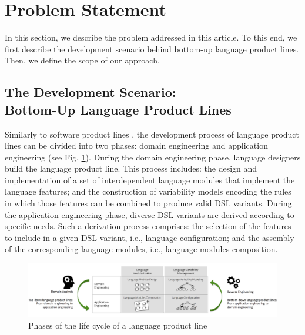 \section{Problem Statement}
\label{sec:problemstatement}

In this section, we describe the problem addressed in this article. To this end, we first describe the development scenario behind bottom-up language product lines. Then, we define the scope of our approach. %

\subsection{The Development Scenario: \\ \textbf{Bottom-Up Language Product Lines}}
\label{sec:thedevelopmentscenario}

Similarly to software product lines \cite{Linden:2007}, the development process of language product lines can be divided into two phases: domain engineering and application engineering (see Fig. \ref{fig:lple-dimensions}). During the domain engineering phase, language designers build the language product line. This process includes: the design and implementation of a set of interdependent language modules that implement the language features; and the construction of variability models encoding the rules in which those features can be combined to produce valid DSL variants. During the application engineering phase, diverse DSL variants are derived according to specific needs. Such a derivation process comprises: the selection of the features to include in a given DSL variant, i.e., language configuration; and the assembly of the corresponding language modules, i.e., language modules composition.

\begin{figure}
\centering
\includegraphics[width=1\linewidth]{images/lple-dimensions-fig.png}
\caption{Phases of the life cycle of a language product line \label{fig:lple-dimensions}}
\end{figure}

